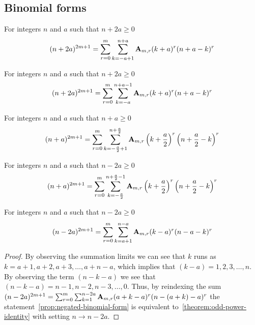 \subsection{Binomial forms}\label{subsec:binomial-forms}

\begin{corollary}
    \label{prop:binomial-form}
    For integers $n$ and $a$ such that $n+2a \geq 0$
    \begin{align*}
    (n+2a)^{2m+1} = \sum_{r=0}^{m} \sum_{k=-a+1}^{n+a} {\mathbf{A}} \sb{m,r} (k+a)^r (n+a-k)^r
    \end{align*}
\end{corollary}

\begin{corollary}
    \label{prop:shifted-binomial-form}
    For integers $n$ and $a$ such that $n+2a \geq 0$
    \begin{align*}
    (n+2a)^{2m+1} = \sum_{r=0}^{m} \sum_{k=-a}^{n+a-1} {\mathbf{A}} \sb{m,r} (k+a)^r (n+a-k)^r
    \end{align*}
\end{corollary}

\begin{corollary}
    \label{cor:centered-binomial-form}
    For integers $n$ and $a$ such that $n+a \geq 0$
    \begin{align*}
    (n+a)^{2m+1} = \sum_{r=0}^{m} \sum_{k=-\frac{a}{2}+1}^{n+\frac{a}{2}} {\mathbf{A}} \sb{m,r} \left( k+\frac{a}{2} \right)^r \left( n+\frac{a}{2}-k \right)^r
    \end{align*}
\end{corollary}

\begin{corollary}
    \label{cor:shifted-centered-binomial-form}
    For integers $n$ and $a$ such that $n-2a \geq 0$
    \begin{align*}
    (n+a)^{2m+1} = \sum_{r=0}^{m} \sum_{k=-\frac{a}{2}}^{n+\frac{a}{2}-1} {\mathbf{A}} \sb{m,r} \left( k+\frac{a}{2} \right)^r \left( n+\frac{a}{2}-k \right)^r
    \end{align*}
\end{corollary}

\begin{proposition}
    \label{prop:negated-binomial-form}
    For integers $n$ and $a$ such that $n-2a \geq 0$
    \begin{align*}
    (n-2a)^{2m+1} = \sum_{r=0}^{m} \sum_{k=a+1}^{n-a} {\mathbf{A}} \sb{m,r} (k-a)^r (n-a-k)^r
    \end{align*}
    \begin{proof}
        By observing the summation limits we can see that $k$ runs as $k=a+1,a+2,a+3,\ldots,a+n-a$, which
        implies that $(k-a)=1,2,3,\ldots, n$.
        By observing the term $(n-k-a)$ we see that $(n-k-a)=n-1,n-2,n-3,\ldots,0$.
        Thus, by reindexing the sum
        $(n-2a)^{2m+1} = \sum_{r=0}^{m} \sum_{k=1}^{n-2a} {\mathbf{A}} \sb{m,r} (a+k-a)^r (n-(a+k)-a)^r$
        the statement~\eqref{prop:negated-binomial-form} is equivalent to~\eqref{theorem:odd-power-identity}
        with setting $n \rightarrow n-2a$.
    \end{proof}
\end{proposition}

